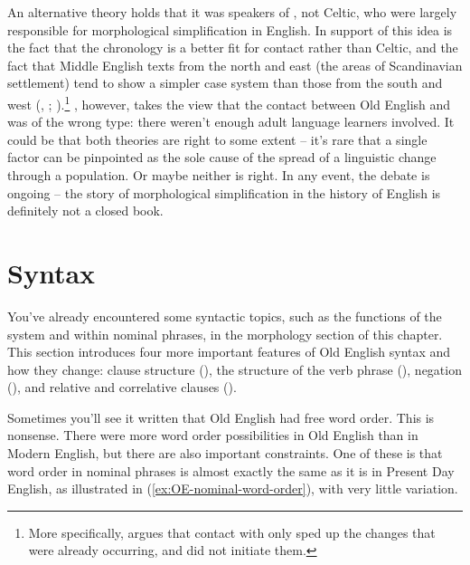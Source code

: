 An alternative theory holds that it was speakers of , not Celtic, who were largely responsible for morphological simplification in English. In support of this idea is the fact that the chronology is a better fit for  contact rather than Celtic, and the fact that Middle English texts from the north and east (the areas of Scandinavian settlement) tend to show a simpler case system than those from the south and west (\citealp[212]{Allen1995}, \citealp{Allen1997}; \citealp{Warner2017}).\footnote{More specifically, \citet{Allen1997} argues that contact with  only sped up the changes that were already occurring, and did not initiate them.} \citet{Trudgill2011}, however, takes the view that the contact between Old English and  was of the wrong type: there weren't enough adult language learners involved. It could be that both theories are right to some extent -- it's rare that a single factor can be pinpointed as the sole cause of the spread of a linguistic change through a population. Or maybe neither is right. In any event, the debate is ongoing -- the story of morphological simplification in the history of English is definitely not a closed book.


\section{Syntax}\label{OE-syntax}

You've already encountered some syntactic topics, such as the functions of the  system and  within nominal phrases, in the morphology section of this chapter. This section introduces four more important features of Old English syntax and how they change: clause structure (), the structure of the verb phrase (), negation (), and relative and correlative clauses ().

Sometimes you'll see it written that Old English had free word order. This is nonsense. There were more word order possibilities in Old English than in Modern English, but there are also important constraints. One of these is that word order in nominal phrases is almost exactly the same as it is in Present Day English, as illustrated in (\ref{ex:OE-nominal-word-order}), with very little variation.

